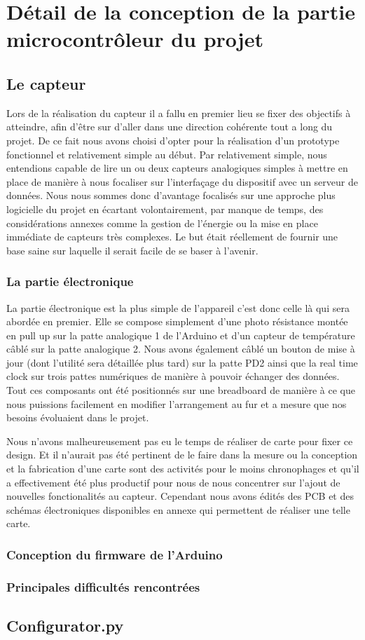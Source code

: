\section{Détail de la conception de la partie microcontrôleur du projet}
	\subsection{Le capteur}
		Lors de la réalisation du capteur il a fallu en premier lieu se fixer
		des objectifs à atteindre, afin d'être sur d'aller dans une direction
		cohérente tout a long du projet. De  ce fait nous avons choisi d'opter pour
		la réalisation d'un prototype fonctionnel et relativement simple au début.
		Par relativement simple, nous entendions capable de lire un ou deux capteurs
		analogiques simples à mettre en place de manière à nous focaliser sur
		l'interfaçage du dispositif avec un serveur de données. Nous nous sommes
		donc d'avantage focalisés sur une approche plus logicielle du projet en
		écartant volontairement, par manque de temps, des considérations annexes
		comme la gestion de l'énergie ou la mise en place immédiate de capteurs
		très complexes. Le but était réellement de fournir une base saine sur laquelle
		il serait facile de se baser à l'avenir.
		
		\subsubsection{La partie électronique}
		
		La partie électronique est la plus simple de l'appareil c'est donc celle
		là qui sera abordée en premier. Elle se compose simplement d'une photo résistance
		montée en pull up sur la patte analogique 1 de l'Arduino et d'un capteur de
		température câblé sur la patte analogique 2. Nous avons également câblé un bouton de
		mise à jour (dont l'utilité sera détaillée plus tard) sur la patte PD2
		ainsi que la real time clock sur trois pattes numériques de manière à pouvoir
		échanger des données. Tout ces composants ont été positionnés sur une breadboard
		de manière à ce que nous puissions facilement en modifier l'arrangement au fur et a mesure
		que nos besoins évoluaient dans le projet.
		\par
		Nous n'avons malheureusement pas eu le temps de réaliser de carte
		pour fixer ce design. Et il n'aurait pas été pertinent de le faire dans la mesure
		ou la conception et la fabrication d'une carte sont des activités pour
		le moins chronophages et qu'il a effectivement été plus productif pour nous de nous
		concentrer sur l'ajout de nouvelles fonctionalités au capteur. Cependant
		nous avons édités des PCB et des schémas électroniques disponibles en
		annexe qui permettent de réaliser une telle carte.
		
		\subsubsection{Conception du firmware de l'Arduino}
		
		
		\subsubsection{Principales difficultés rencontrées}
		
	\subsection{Configurator.py}

